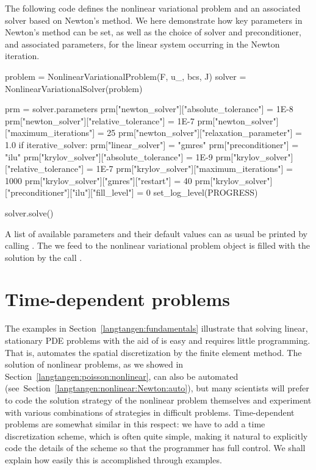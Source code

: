 The following code defines the nonlinear variational problem and
an associated solver based on Newton's method. We here demonstrate
how key parameters in
Newton's method can be set, as well as the choice of
solver and preconditioner, and associated parameters, for the
linear system occurring in the Newton iteration.
\vspace*{3pt}
\begin{python}
problem = NonlinearVariationalProblem(F, u_, bcs, J)
solver  = NonlinearVariationalSolver(problem)

prm = solver.parameters
prm["newton_solver"]["absolute_tolerance"] = 1E-8
prm["newton_solver"]["relative_tolerance"] = 1E-7
prm["newton_solver"]["maximum_iterations"] = 25
prm["newton_solver"]["relaxation_parameter"] = 1.0
if iterative_solver:
    prm["linear_solver"] = "gmres"
    prm["preconditioner"] = "ilu"
    prm["krylov_solver"]["absolute_tolerance"] = 1E-9
    prm["krylov_solver"]["relative_tolerance"] = 1E-7
    prm["krylov_solver"]["maximum_iterations"] = 1000
    prm["krylov_solver"]["gmres"]["restart"] = 40
    prm["krylov_solver"]["preconditioner"]["ilu"]["fill_level"] = 0
set_log_level(PROGRESS)

solver.solve()
\end{python}
A list of available parameters and their default values can as
usual be printed by calling .
The  we feed to the nonlinear variational problem object
is filled with the solution by the call .

\section{Time-dependent problems}
\label{langtangen:timedep}

The examples in Section~\ref{langtangen:fundamentals} illustrate that
solving linear, stationary PDE problems with the aid of \fenics{} is
easy and requires little programming.  That is, \fenics{} automates
the spatial discretization by the finite element method.  The solution
of nonlinear problems, as we showed in
Section~\ref{langtangen:poisson:nonlinear}, can also be automated
(see~Section~\ref{langtangen:nonlinear:Newton:auto}), but many
scientists will prefer to code the solution strategy of the nonlinear
problem themselves and experiment with various combinations of
strategies in difficult problems. Time-dependent problems are somewhat
similar in this respect: we have to add a time discretization scheme,
which is often quite simple, making it natural to explicitly code the
details of the scheme so that the programmer has full control.  We
shall explain how easily this is accomplished through examples.

